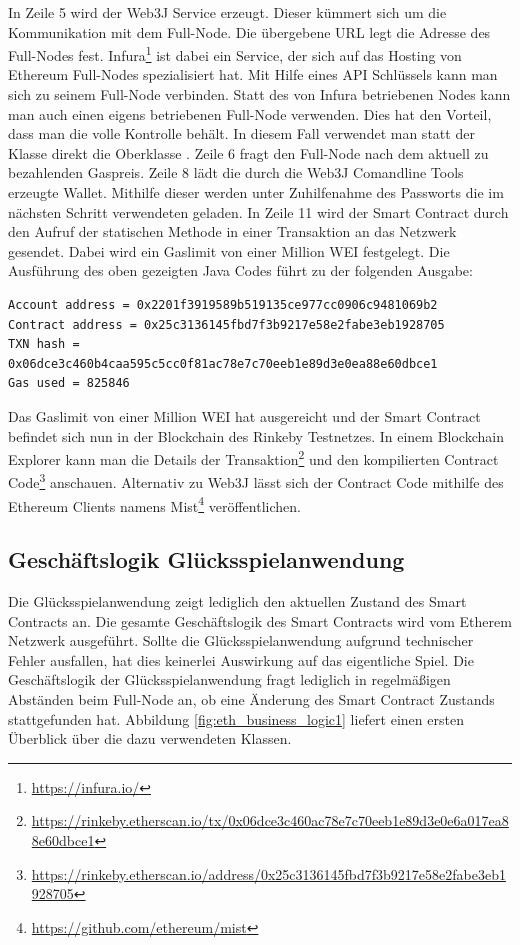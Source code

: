 

In Zeile 5 wird der Web3J Service erzeugt. Dieser kümmert sich um die Kommunikation mit dem Full-Node. Die übergebene URL legt die Adresse des Full-Nodes fest. Infura\footnote{\url{https://infura.io/}} ist dabei ein Service, der sich auf das Hosting von Ethereum Full-Nodes spezialisiert hat. Mit Hilfe eines API Schlüssels kann man sich zu seinem Full-Node verbinden. Statt des von Infura betriebenen Nodes kann man auch einen eigens betriebenen Full-Node verwenden. Dies hat den Vorteil, dass man die volle Kontrolle behält. In diesem Fall verwendet man statt der  Klasse direkt die Oberklasse .
Zeile 6 fragt den Full-Node nach dem aktuell zu bezahlenden Gaspreis.
Zeile 8 lädt die durch die Web3J Comandline Tools erzeugte Wallet. Mithilfe dieser werden unter Zuhilfenahme des Passworts die im nächsten Schritt verwendeten  geladen.
In Zeile 11 wird der Smart Contract durch den Aufruf der statischen  Methode in einer Transaktion an das Netzwerk gesendet. Dabei wird ein Gaslimit von einer Million WEI festgelegt.
Die Ausführung des oben gezeigten Java Codes führt zu der folgenden Ausgabe:

\begin{verbatim}
Account address = 0x2201f3919589b519135ce977cc0906c9481069b2
Contract address = 0x25c3136145fbd7f3b9217e58e2fabe3eb1928705
TXN hash = 0x06dce3c460b4caa595c5cc0f81ac78e7c70eeb1e89d3e0ea88e60dbce1
Gas used = 825846
\end{verbatim}

Das Gaslimit von einer Million WEI hat ausgereicht und der Smart Contract befindet sich nun in der Blockchain des Rinkeby Testnetzes. In einem Blockchain Explorer kann man die Details der Transaktion\footnote{\url{https://rinkeby.etherscan.io/tx/0x06dce3c460ac78e7c70eeb1e89d3e0e6a017ea88e60dbce1}} und den kompilierten Contract Code\footnote{\url{https://rinkeby.etherscan.io/address/0x25c3136145fbd7f3b9217e58e2fabe3eb1928705}} anschauen.
\if Alternativ zu Web3J lässt sich der Contract Code mithilfe des Ethereum Clients namens Mist\footnote{\url{https://github.com/ethereum/mist}} veröffentlichen.
\fi

\subsection{Geschäftslogik Glücksspielanwendung}

Die Glücksspielanwendung zeigt lediglich den aktuellen Zustand des Smart Contracts an. Die gesamte Geschäftslogik des Smart Contracts wird vom Etherem Netzwerk ausgeführt. Sollte die Glücksspielanwendung aufgrund technischer Fehler ausfallen, hat dies keinerlei Auswirkung auf das eigentliche Spiel. Die Geschäftslogik der Glücksspielanwendung fragt lediglich in regelmäßigen Abständen beim Full-Node an, ob eine Änderung des Smart Contract Zustands stattgefunden hat. Abbildung \ref{fig:eth_business_logic1} liefert einen ersten Überblick über die dazu verwendeten Klassen.

